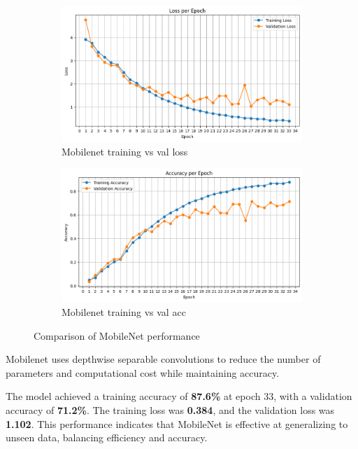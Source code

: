 \documentclass[12pt]{article}
\begin{document}
\begin{figure}[ht]
    \centering
    \begin{subfigure}{0.45\linewidth}
        \centering
        \includegraphics[width=\linewidth]{t3_mobilenet_loss.png}
        \caption{Mobilenet training vs val loss}
        \label{fig:t3_mobilenet_loss}
    \end{subfigure}
    \hfill
    \begin{subfigure}{0.45\linewidth}
        \centering
        \includegraphics[width=\linewidth]{t3_mobilenet_acc.png}
        \caption{Mobilenet training vs val acc}
        \label{fig:t3_mobilenet_acc}
    \end{subfigure}
    \caption{Comparison of MobileNet performance}
    \label{fig:t3_mobilenet_performance}
\end{figure}

Mobilenet uses depthwise separable convolutions to reduce the number of parameters and computational cost while maintaining accuracy.

The model achieved a training accuracy of \textbf{87.6\%} at epoch 33, with a validation accuracy of \textbf{71.2\%}. The training loss was \textbf{0.384}, and the validation loss was \textbf{1.102}. This performance indicates that MobileNet is effective at generalizing to unseen data, balancing efficiency and accuracy.
\end{document}
